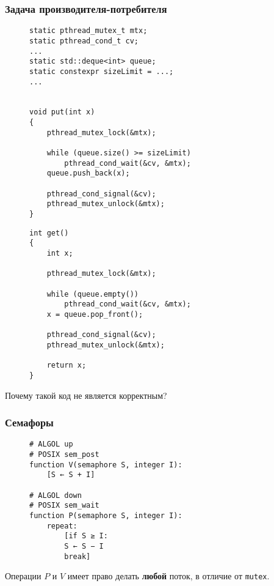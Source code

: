 \documentclass[aspectratio=169, pdf, 8pt, unicode]{beamer}
\begin{document}
\begin{frame}[fragile]
\frametitle{Задача производителя-потребителя}
\begin{figure}[H]
\begin{minipage}{0.4\textwidth}
\begin{verbatim}
static pthread_mutex_t mtx;
static pthread_cond_t cv;
...
static std::deque<int> queue;
static constexpr sizeLimit = ...;
...


void put(int x)
{
    pthread_mutex_lock(&mtx);

    while (queue.size() >= sizeLimit)
        pthread_cond_wait(&cv, &mtx);
    queue.push_back(x);

    pthread_cond_signal(&cv);
    pthread_mutex_unlock(&mtx);
}

\end{verbatim}
\end{minipage}
\begin{minipage}{0.4\textwidth}
\begin{verbatim}
int get()
{
    int x;

    pthread_mutex_lock(&mtx);

    while (queue.empty())
        pthread_cond_wait(&cv, &mtx);
    x = queue.pop_front();

    pthread_cond_signal(&cv);
    pthread_mutex_unlock(&mtx);

    return x;
}
\end{verbatim}
\end{minipage}
\end{figure}
Почему такой код не является корректным?
\end{frame}
\begin{frame}[fragile]
\frametitle{Семафоры}
\begin{figure}[H]
\centering
\begin{minipage}{0.4\textwidth}
\begin{verbatim}
# ALGOL up
# POSIX sem_post
function V(semaphore S, integer I):
    [S ← S + I]

# ALGOL down
# POSIX sem_wait
function P(semaphore S, integer I):
    repeat:
        [if S ≥ I:
        S ← S − I
        break]
\end{verbatim}
\end{minipage}
\end{figure}
Операции $P$ и $V$ имеет право делать \textbf{любой} поток, в отличие от \texttt{mutex}.
\end{frame}
\end{document}
